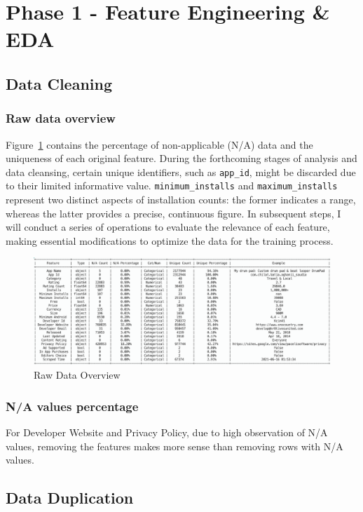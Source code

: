 \section{Phase 1 - Feature Engineering \& EDA}
\subsection{Data Cleaning}

\subsubsection{Raw data overview}
Figure~\ref{fig:raw-data} contains the percentage of non-applicable (N/A) data and the uniqueness of each original feature. During the forthcoming stages of analysis and data cleansing, certain unique identifiers, such as \texttt{app\_id}, might be discarded due to their limited informative value. \texttt{minimum\_installs} and \texttt{maximum\_installs} represent two distinct aspects of installation counts: the former indicates a range, whereas the latter provides a precise, continuous figure. In subsequent steps, I will conduct a series of operations to evaluate the relevance of each feature, making essential modifications to optimize the data for the training process.

\begin{figure}
    \centering
    \includegraphics[width=1\linewidth]{docs//assets/raw-data-overview.png}
    \caption{Raw Data Overview}
    \label{fig:raw-data}
\end{figure}

\subsubsection{N/A values percentage}
For Developer Website and Privacy Policy, due to high observation of N/A values, removing the features makes more sense than removing rows with N/A values.

\subsection{Data Duplication}

